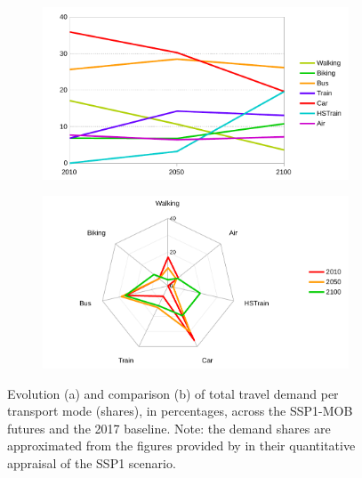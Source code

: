 %
\begin{figure}
		\centering
  \begin{subfigure}{0.45\textwidth}
    \includegraphics[width=\linewidth]{figures/line_travel-demand-shares.pdf}
    \caption{}
    \label{fig:results:line_travel-demand-shares}
  \end{subfigure}
  \begin{subfigure}{0.45\textwidth}
    \includegraphics[width=\linewidth]{figures/radar_travel-demand-shares.pdf}
    \caption{}
    \label{fig:results:radar_travel-demand-shares}
  \end{subfigure}
  \caption[Evolution and comparison of travel demand shares in SSP1-MOB.]{Evolution (a) and comparison (b) of total travel demand per transport mode (shares), in percentages, across the SSP1-MOB futures and the 2017 baseline. Note: the demand shares are approximated from the figures provided by \textcite{vuuren2017_Energylanduse} in their quantitative appraisal of the SSP1 scenario.}
\end{figure}


